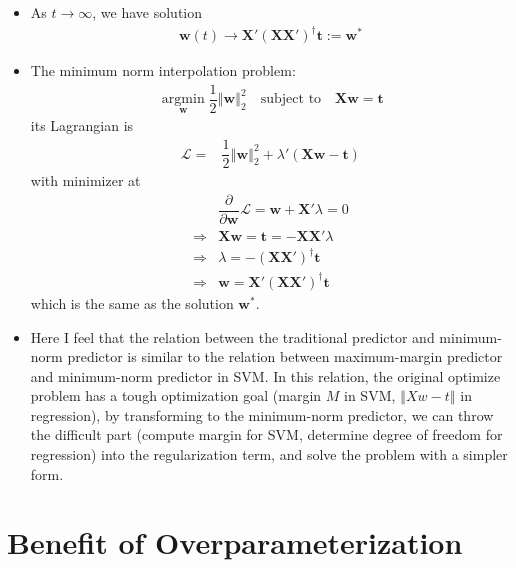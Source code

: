 \documentclass[11pt,a4paper]{ctexart}
\numberwithin{equation}{section}%
\begin{document}
\begin{itemize}[topsep=2pt,itemsep=0pt]
    \item As $ t\to\infty $, we have solution
    \begin{align*}
        \mathbf{w}(t)\to \mathbf{X}'(\mathbf{X}\mathbf{X}')^\dagger\mathbf{t} := \mathbf{w}^*
    \end{align*}
    \item The minimum norm interpolation problem:
    \begin{align*}
        \mathop{ \arg\min }\limits_{\mathbf{w}} \dfrac{ 1 }{ 2 } \left\Vert \mathbf{w} \right\Vert _2^2\quad \text{subject to}\quad \mathbf{X}\mathbf{w}=\mathbf{t}   
    \end{align*}
    its Lagrangian is
    \begin{align*}
        \mathcal{L} =&  \dfrac{ 1 }{ 2 } \left\Vert \mathbf{w} \right\Vert _2^2 + \lambda'(\mathbf{X}\mathbf{w}-\mathbf{t})
    \end{align*}
    with minimizer at
    \begin{align*}
        &\dfrac{\partial^{}  }{\partial \mathbf{w}^{} } \mathcal{L} = \mathbf{w}+ \mathbf{X}'\lambda = 0\\
        \Rightarrow & \mathbf{X}\mathbf{w} = \mathbf{t}= -\mathbf{X}\mathbf{X}'\lambda \\
        \Rightarrow & \lambda = -(\mathbf{X}\mathbf{X}')^\dagger\mathbf{t}\\
        \Rightarrow & \mathbf{w} = \mathbf{X}'(\mathbf{X}\mathbf{X}')^\dagger\mathbf{t}
    \end{align*}
    which is the same as the solution $ \mathbf{w}^* $.

    \item Here I feel that the relation between the traditional predictor and minimum-norm predictor is similar to the relation between maximum-margin predictor and minimum-norm predictor in SVM. In this relation, the original optimize problem has a tough optimization goal (margin $ M $ in SVM, $ \left\Vert Xw-t \right\Vert  $ in regression), by transforming to the minimum-norm predictor, we can throw the difficult part (compute margin for SVM, determine degree of freedom for regression) into the regularization term, and solve the problem with a simpler form.
\end{itemize}


\section{Benefit of Overparameterization}
\end{document}
